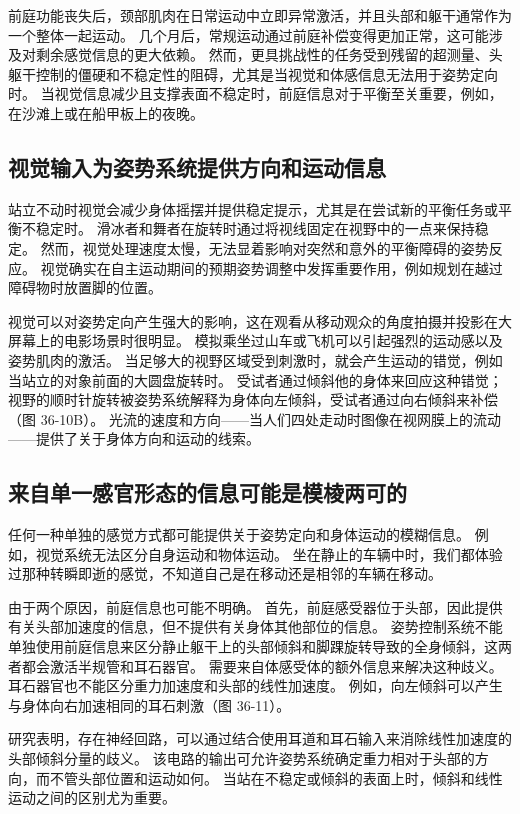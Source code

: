 前庭功能丧失后，颈部肌肉在日常运动中立即异常激活，并且头部和躯干通常作为一个整体一起运动。 几个月后，常规运动通过前庭补偿变得更加正常，这可能涉及对剩余感觉信息的更大依赖。 然而，更具挑战性的任务受到残留的超测量、头躯干控制的僵硬和不稳定性的阻碍，尤其是当视觉和体感信息无法用于姿势定向时。 当视觉信息减少且支撑表面不稳定时，前庭信息对于平衡至关重要，例如，在沙滩上或在船甲板上的夜晚。

\subsection{视觉输入为姿势系统提供方向和运动信息}
站立不动时视觉会减少身体摇摆并提供稳定提示，尤其是在尝试新的平衡任务或平衡不稳定时。 滑冰者和舞者在旋转时通过将视线固定在视野中的一点来保持稳定。 然而，视觉处理速度太慢，无法显着影响对突然和意外的平衡障碍的姿势反应。 视觉确实在自主运动期间的预期姿势调整中发挥重要作用，例如规划在越过障碍物时放置脚的位置。

视觉可以对姿势定向产生强大的影响，这在观看从移动观众的角度拍摄并投影在大屏幕上的电影场景时很明显。 模拟乘坐过山车或飞机可以引起强烈的运动感以及姿势肌肉的激活。 当足够大的视野区域受到刺激时，就会产生运动的错觉，例如当站立的对象前面的大圆盘旋转时。 受试者通过倾斜他的身体来回应这种错觉； 视野的顺时针旋转被姿势系统解释为身体向左倾斜，受试者通过向右倾斜来补偿（图 36-10B）。 光流的速度和方向——当人们四处走动时图像在视网膜上的流动——提供了关于身体方向和运动的线索。

\subsection{来自单一感官形态的信息可能是模棱两可的}
任何一种单独的感觉方式都可能提供关于姿势定向和身体运动的模糊信息。 例如，视觉系统无法区分自身运动和物体运动。 坐在静止的车辆中时，我们都体验过那种转瞬即逝的感觉，不知道自己是在移动还是相邻的车辆在移动。

由于两个原因，前庭信息也可能不明确。 首先，前庭感受器位于头部，因此提供有关头部加速度的信息，但不提供有关身体其他部位的信息。 姿势控制系统不能单独使用前庭信息来区分静止躯干上的头部倾斜和脚踝旋转导致的全身倾斜，这两者都会激活半规管和耳石器官。 需要来自体感受体的额外信息来解决这种歧义。 耳石器官也不能区分重力加速度和头部的线性加速度。 例如，向左倾斜可以产生与身体向右加速相同的耳石刺激（图 36-11）。

研究表明，存在神经回路，可以通过结合使用耳道和耳石输入来消除线性加速度的头部倾斜分量的歧义。 该电路的输出可允许姿势系统确定重力相对于头部的方向，而不管头部位置和运动如何。 当站在不稳定或倾斜的表面上时，倾斜和线性运动之间的区别尤为重要。

